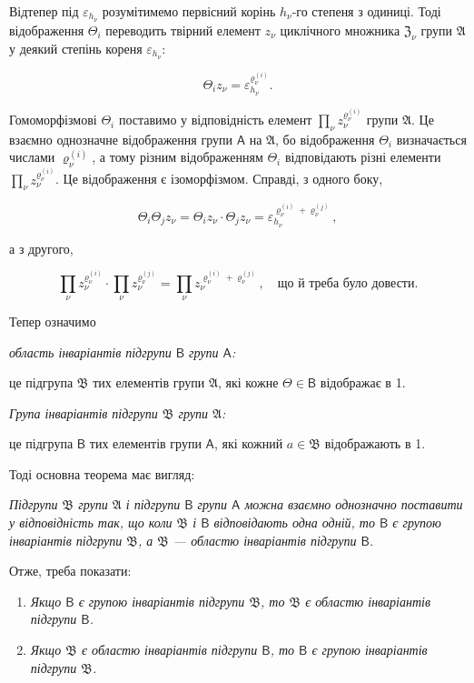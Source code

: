 \documentclass[11pt]{article}
\begin{document}
Відтепер під \(\varepsilon_{h_\nu}\) розумітимемо первісний корінь \(h_\nu\)-го степеня з одиниці. Тоді відображення \(\Theta_i\) переводить твірний елемент \(z_\nu\) циклічного множника \(\mathfrak Z_\nu\) групи \(\mathfrak A\) у деякий степінь кореня \(\varepsilon_{h_\nu}\):

\[
\Theta_i z_\nu=\varepsilon_{h_\nu}^{\varrho_\nu^{(i)}}.
\]

Гомоморфізмові \(\Theta_i\) поставимо у відповідність елемент \(\prod_\nu z_\nu^{\varrho_\nu^{(i)}}\) групи \(\mathfrak A\). Це взаємно однозначне відображення групи \(\mathsf A\) на \(\mathfrak A\), бо відображення \(\Theta_i\) визначається числами \(\varrho_\nu^{(i)}\), а тому різним відображенням \(\Theta_i\) відповідають різні елементи \(\prod_\nu z_\nu^{\varrho_\nu^{(i)}}\). Це відображення є ізоморфізмом. Справді, з одного боку,

\[
\Theta_i\Theta_j z_\nu=\Theta_i z_\nu\cdot \Theta_j z_\nu
=\varepsilon_{h_\nu}^{\varrho_\nu^{(i)}+\varrho_\nu^{(j)}},
\]

а з другого,

\[
\prod_\nu z_\nu^{\varrho_\nu^{(i)}}\cdot
\prod_\nu z_\nu^{\varrho_\nu^{(j)}}=
\prod_\nu z_\nu^{\varrho_\nu^{(i)}+\varrho_\nu^{(j)}},
\quad\text{що й треба було довести.}
\]

Тепер означимо

\emph{область інваріантів підгрупи \(\mathsf B\) групи \(\mathsf A\):}

це підгрупа \(\mathfrak B\) тих елементів групи \(\mathfrak A\), які кожне \(\Theta\in\mathsf B\) відображає в 1.

\emph{Група інваріантів підгрупи \(\mathfrak B\) групи \(\mathfrak A\):}

це підгрупа \(\mathsf B\) тих елементів групи \(\mathsf A\), які кожний \(a\in\mathfrak B\) відображають в 1.

Тоді основна теорема має вигляд:

\emph{Підгрупи \(\mathfrak B\) групи \(\mathfrak A\) і підгрупи \(\mathsf B\) групи \(\mathsf A\) можна взаємно однозначно поставити у відповідність так, що коли \(\mathfrak B\) і \(\mathsf B\) відповідають одна одній, то \(\mathsf B\) є групою інваріантів підгрупи \(\mathfrak B\), а \(\mathfrak B\) --- областю інваріантів підгрупи \(\mathsf B\).}

Отже, треба показати:

\begin{enumerate}
\item \emph{Якщо \(\mathsf B\) є групою інваріантів підгрупи \(\mathfrak B\), то \(\mathfrak B\) є областю інваріантів підгрупи \(\mathsf B\).}
\item \emph{Якщо \(\mathfrak B\) є областю інваріантів підгрупи \(\mathsf B\), то \(\mathsf B\) є групою інваріантів підгрупи \(\mathfrak B\).}
\end{enumerate}
\end{document}
